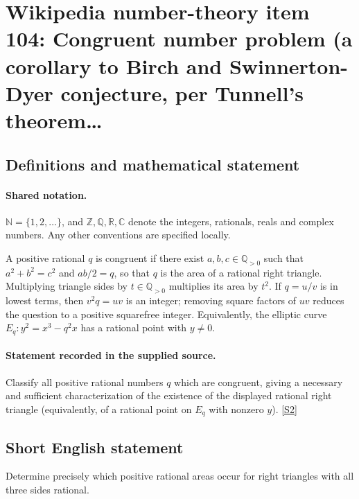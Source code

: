 \documentclass[11pt]{article}
\newcommand{\sref}[2]{\hyperlink{source:#1:#2}{[S#2]}}
\begin{document}
\section{Wikipedia number-theory item 104: Congruent number problem (a corollary to Birch and Swinnerton-Dyer conjecture, per Tunnell's theorem…}\label{statement}

\subsection{Definitions and mathematical statement}

\paragraph{Shared notation.}$\mathbb N=\{1,2,\ldots\}$, and $\mathbb Z,\mathbb Q,\mathbb R,\mathbb C$ denote the integers, rationals, reals and complex numbers. Any other conventions are specified locally.


A positive rational $q$ is congruent if there exist $a,b,c\in\mathbb Q_{>0}$ such that $a^2+b^2=c^2$ and $ab/2=q$, so that $q$ is the area of a rational right triangle. Multiplying triangle sides by $t\in\mathbb Q_{>0}$ multiplies its area by $t^2$. If $q=u/v$ is in lowest terms, then $v^2q=uv$ is an integer; removing square factors of $uv$ reduces the question to a positive squarefree integer. Equivalently, the elliptic curve $E_q:y^2=x^3-q^2x$ has a rational point with $y\ne0$.
\paragraph{Statement recorded in the supplied source.}
Classify all positive rational numbers $q$ which are congruent, giving a necessary and sufficient characterization of the existence of the displayed rational right triangle (equivalently, of a rational point on $E_q$ with nonzero $y$). \sref{statement}{2}
\subsection{Short English statement}
Determine precisely which positive rational areas occur for right triangles with all three sides rational.
\end{document}
